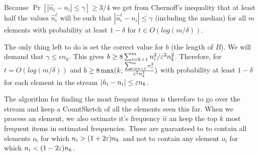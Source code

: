 \documentclass{article}
\begin{document}
Because $\Pr\left[ \left| \hat{n}_i - n_i \right| \le \gamma \right] \ge 3/4$ we get from Chernoff's inequality that
at least half the values $\hat{n}^\ell_i$ will be such that $\left| \hat{n}^\ell_i - n_i \right| \le \gamma$ (including the median)
for all $m$ elements with probability at least $1-\delta$ for $t \in O(log(m/\delta))$.

The only thing left to do is set the correct value for $b$ (the length of $B$).
We will demand that $\gamma \le \epsilon n_k$. This gives $b \ge 8\sum_{i=k+1}^{m}n^2_i/\varepsilon^2 n_k^2$.
Therefore, for $t = O(log(m/\delta))$ and $b \ge 8\max(k,\frac{\sum_{i=k+1}^{m}n^2_i}{\varepsilon^2 n_k^2})$
with probability at least $1-\delta$ for each element in the stream $|\hat{n}_i - n_i| \le \varepsilon n_k$.



The algorithm for finding the most frequent items is therefore to go over the stream and keep a CountSketch 
of all the elements seen this far. When we process an element, we also estimate it's frequency $\hat{n}$ an keep the top $k$
most frequent items in estimated frequencies. These are guaranteed to to contain all elements $o_i$ for which $n_i > (1+2\varepsilon)n_k$
and not to contain any element  $o_i$ for which $n_i < (1-2\varepsilon)n_k$.




\end{document}
